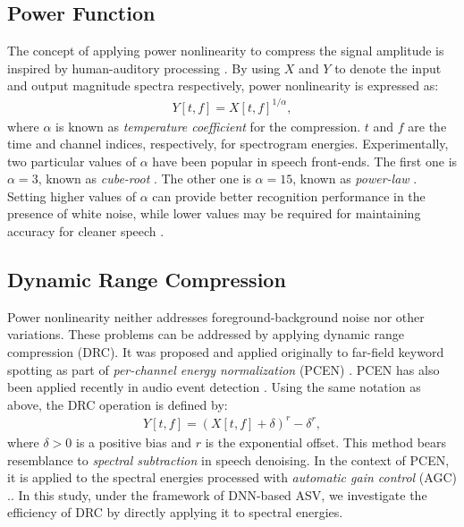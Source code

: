 \documentclass{article}
\begin{document}
\subsection{Power Function}
\label{ssec:root}
The concept of applying power nonlinearity to compress the signal amplitude is inspired by human-auditory processing \cite{human_auditory, pncc_2012}. By using $X$ and $Y$ to denote the input and output magnitude spectra respectively, power nonlinearity is expressed as:
\begin{align}
    Y[t,f] = X[t,f]^{1/\alpha},
\label{eq:powerlaw}
\end{align}
where $\alpha$ is known as \emph{temperature coefficient} for the compression. $t$ and $f$ are the time and channel indices, respectively, for spectrogram energies. Experimentally, two particular values of $\alpha$ have been popular in speech front-ends. The first one is $\alpha=3$, known as \emph{cube-root} \cite{rastaplp1990, multitaper_mfcc_plp2013, mhec}. The other one is $\alpha=15$, known as \emph{power-law} \cite{kim_pncc_thesis2010}. Setting higher values of $\alpha$ can provide better recognition performance in the presence of white noise, while lower values may be required for maintaining accuracy for cleaner speech \cite{pncc}.


\subsection{Dynamic Range Compression}
\label{ssec:drc}
Power nonlinearity neither addresses foreground-background noise nor other variations. These problems can be addressed by applying dynamic range compression (DRC). It was proposed and applied originally to far-field keyword spotting as part of \emph{per-channel energy normalization} (PCEN) \cite{pcen_2017, pcen_2018}. 
PCEN has also been applied recently in audio event detection \cite{pcen_sed_2021}. Using the same notation as above, the DRC operation is defined by:
\begin{align}
    Y[t,f] = (X[t,f] + \delta)^{r} - \delta^{r},
\label{eq:drc}
\end{align}
where $\delta > 0$ is a positive bias and $r$ is the exponential offset. This method bears resemblance to \emph{spectral subtraction} \cite{speech_restoration} in speech denoising. In the context of PCEN, it is applied to the spectral energies processed with \emph{automatic gain control} (AGC) \cite{agc}.. In this study, under the framework of DNN-based ASV, we investigate the efficiency of DRC by directly applying it to spectral energies. 
\end{document}
